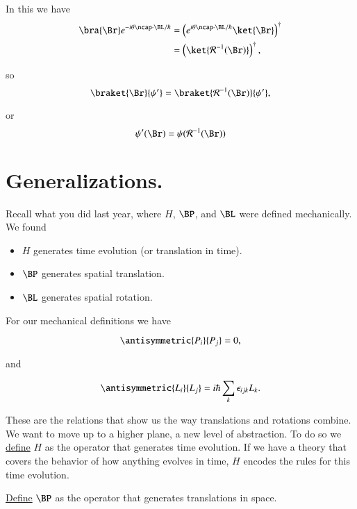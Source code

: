 In this we have
\begin{align*}
\bra{\Br} e^{-i \theta \ncap \cdot \BL/\hbar }
&=
\left( e^{i \theta \ncap \cdot \BL/\hbar } \ket{\Br} \right)^\dagger \\
&=
\left( \ket{\mathcal{R}^{-1}(\Br) } \right)^\dagger,
\end{align*}

so
\begin{equation}\label{eqn:qmTwoL11:410}
\braket{\Br}{\psi'} = 
\braket{\mathcal{R}^{-1}(\Br) }{\psi'},
\end{equation}

or
\begin{equation}\label{eqn:qmTwoL11:430}
\psi'(\Br) = \psi( \mathcal{R}^{-1}(\Br) )
\end{equation}

\section{Generalizations.}

Recall what you did last year, where $H$, $\BP$, and $\BL$ were defined mechanically.  We found

\begin{itemize}
\item $H$ generates time evolution (or translation in time).
\item $\BP$ generates spatial translation.
\item $\BL$ generates spatial rotation.
\end{itemize}

For our mechanical definitions we have

\begin{equation}\label{eqn:qmTwoL11:450}
\antisymmetric{P_i}{P_j} = 0,
\end{equation}

and

\begin{equation}\label{eqn:qmTwoL11:470}
\antisymmetric{L_i}{L_j} = i \hbar \sum_k \epsilon_{ijk} L_k.
\end{equation}

These are the relations that show us the way translations and rotations combine.  We want to move up to a higher plane, a new level of abstraction.  To do so we \underline{define} $H$ as the operator that generates time evolution.  If we have a theory that covers the behavior of how anything evolves in time, $H$ encodes the rules for this time evolution.

\underline{Define} $\BP$ as the operator that generates translations in space.

